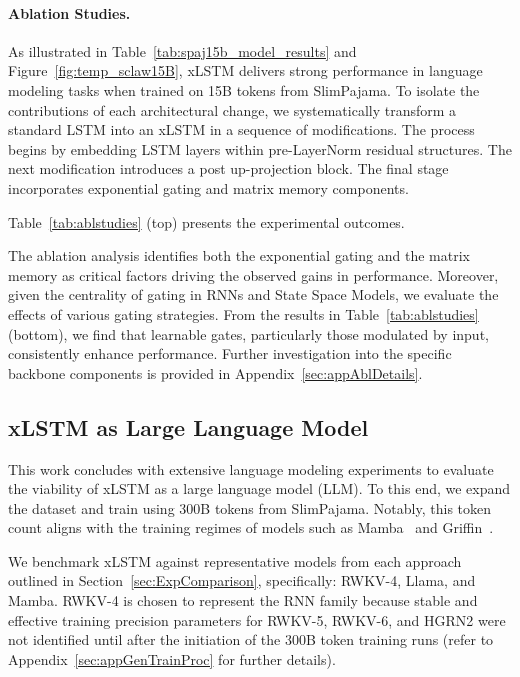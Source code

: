 \paragraph{Ablation Studies.}
As illustrated in Table~\ref{tab:spaj15b_model_results} and Figure~\ref{fig:temp_sclaw15B}, xLSTM delivers strong performance in language modeling tasks when trained on 15B tokens from SlimPajama. To isolate the contributions of each architectural change, we systematically transform a standard LSTM into an xLSTM in a sequence of modifications. The process begins by embedding LSTM layers within pre-LayerNorm residual structures. The next modification introduces a post up-projection block. The final stage incorporates exponential gating and matrix memory components.

Table~\ref{tab:ablstudies} (top) presents the experimental outcomes.

The ablation analysis identifies both the exponential gating and the matrix memory as critical factors driving the observed gains in performance. Moreover, given the centrality of gating in RNNs and State Space Models, we evaluate the effects of various gating strategies. From the results in Table~\ref{tab:ablstudies} (bottom), we find that learnable gates, particularly those modulated by input, consistently enhance performance. Further investigation into the specific backbone components is provided in Appendix~\ref{sec:appAblDetails}.

\subsection{xLSTM as Large Language Model}
\label{sec:ExpLanguage}

This work concludes with extensive language modeling experiments to evaluate the viability of xLSTM as a large language model (LLM). To this end, we expand the dataset and train using 300B tokens from SlimPajama. Notably, this token count aligns with the training regimes of models such as Mamba~\citep{Gu:24arxiv} and Griffin~\citep{De:24arxiv}.

We benchmark xLSTM against representative models from each approach outlined in Section~\ref{sec:ExpComparison}, specifically: RWKV-4, Llama, and Mamba. RWKV-4 is chosen to represent the RNN family because stable and effective training precision parameters for RWKV-5, RWKV-6, and HGRN2 were not identified until after the initiation of the 300B token training runs (refer to Appendix~\ref{sec:appGenTrainProc} for further details). 

